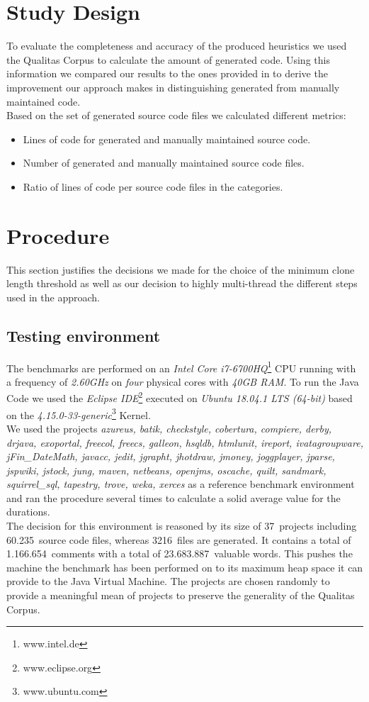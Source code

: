 \section{Study Design}
To evaluate the completeness and accuracy of the produced heuristics we used the Qualitas Corpus to calculate the amount of generated code. Using this information we compared our results to the ones provided in \cite{Bernwieser2014} to derive the improvement our approach makes in distinguishing generated from manually maintained code.\\
Based on the set of generated source code files we calculated different metrics:
\begin{itemize}
	\item Lines of code for generated and manually maintained source code.
	\item Number of generated and manually maintained source code files.
	\item Ratio of lines of code per source code files in the categories.
\end{itemize}

\section{Procedure}
This section justifies the decisions we made for the choice of the minimum clone length threshold as well as our decision to highly multi-thread the different steps used in the approach.

\subsection{Testing environment}
The benchmarks are performed on an \textit{Intel Core i7-6700HQ}\footnote{www.intel.de} CPU running with a frequency of \textit{2.60GHz} on \textit{four} physical cores with \textit{40GB RAM}. To run the Java Code we used the \textit{Eclipse IDE}\footnote{www.eclipse.org} executed on \textit{Ubuntu 18.04.1 LTS (64-bit)} based on the \textit{4.15.0-33-generic}\footnote{\label{ubuntu}www.ubuntu.com} Kernel.\\
We used the projects \textit{azureus, batik, checkstyle, cobertura, compiere, derby, drjava, exoportal, freecol, freecs, galleon, hsqldb, htmlunit, ireport, ivatagroupware, jFin\_DateMath, javacc, jedit, jgrapht, jhotdraw, jmoney, joggplayer, jparse, jspwiki, jstock, jung, maven, netbeans, openjms, oscache, quilt, sandmark, squirrel\_sql, tapestry, trove, weka, xerces} as a reference benchmark environment and ran the procedure several times to calculate a solid average value for the durations. \\
The decision for this environment is reasoned by its size of 37~projects including 60.235~source code files, whereas 3216~files are generated. It contains a total of 1.166.654~comments with a total of 23.683.887~valuable words. This pushes the machine the benchmark has been performed on to its maximum heap space it can provide to the Java Virtual Machine. The projects are chosen randomly to provide a meaningful mean of projects to preserve the generality of the Qualitas Corpus.

